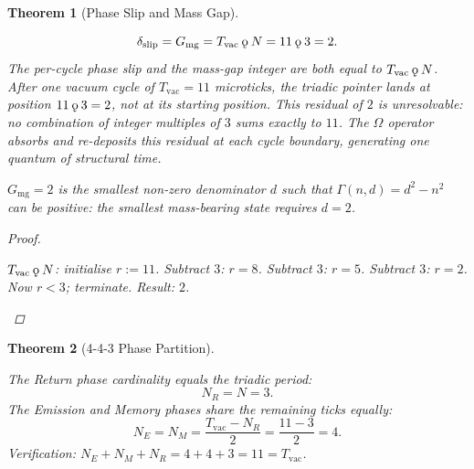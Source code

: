 \documentclass[11pt,letterpaper]{article}
\theoremstyle{plain}
\newtheorem{theorem}{Theorem}[section]
\theoremstyle{definition}
\theoremstyle{remark}
\newcommand{\koppa}{\mathbin{\text{\rm\k{o}}}}
\newcommand{\Tcharge}{\Gamma}
\newcommand{\Gmg}{G_{\mathrm{mg}}}
\newcommand{\dslip}{\delta_{\mathrm{slip}}}
\newcommand{\Tvac}{T_{\mathrm{vac}}}
\begin{document}
\begin{theorem}[Phase Slip and Mass Gap]\label{thm:gmg}
\begin{rsbox}
\[
\dslip = \Gmg = \Tvac\koppa N = 11\koppa3 = 2.
\]
The per-cycle phase slip and the mass-gap integer are both equal to
$\Tvac\koppa N$.  After one vacuum cycle of $\Tvac=11$ microticks,
the triadic pointer lands at position $11\koppa3=2$, not at its
starting position.  This residual of $2$ is unresolvable: no
combination of integer multiples of $3$ sums exactly to $11$.  The
$\Omega$ operator absorbs and re-deposits this residual at each cycle
boundary, generating one quantum of structural time.

$\Gmg=2$ is the smallest non-zero denominator $d$ such that
$\Tcharge(n,d)=d^2-n^2$ can be positive: the smallest mass-bearing
state requires $d=2$.
\end{rsbox}
\begin{proof}
\begin{rsbox}
$\Tvac\koppa N$: initialise $r:=11$.  Subtract $3$: $r=8$.  Subtract
$3$: $r=5$.  Subtract $3$: $r=2$.  Now $r<3$; terminate.  Result: $2$.
\end{rsbox}
\end{proof}
\end{theorem}

\begin{theorem}[4-4-3 Phase Partition]\label{thm:443}
\begin{rsbox}
The Return phase cardinality equals the triadic period:
\[
N_R=N=3.
\]
The Emission and Memory phases share the remaining ticks equally:
\[
N_E=N_M=\frac{\Tvac-N_R}{2}=\frac{11-3}{2}=4.
\]
Verification: $N_E+N_M+N_R=4+4+3=11=\Tvac$.
\end{rsbox}
\end{theorem}
\end{document}
